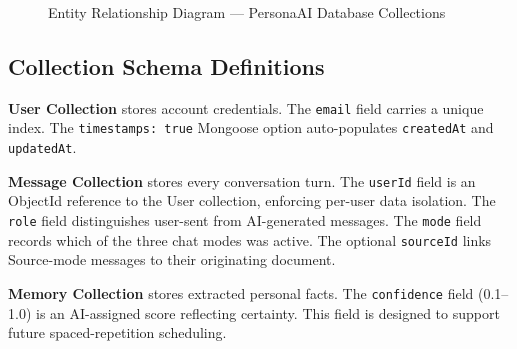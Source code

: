 \documentclass[12pt,a4paper]{report}
\begin{document}
\begin{figure}[H]
\caption{Entity Relationship Diagram — PersonaAI Database Collections}
\label{fig:erd}
\end{figure}

\subsection{Collection Schema Definitions}

\textbf{User Collection} stores account credentials. The \texttt{email} field carries a unique index. The \texttt{timestamps: true} Mongoose option auto-populates \texttt{createdAt} and \texttt{updatedAt}.

\textbf{Message Collection} stores every conversation turn. The \texttt{userId} field is an ObjectId reference to the User collection, enforcing per-user data isolation. The \texttt{role} field distinguishes user-sent from AI-generated messages. The \texttt{mode} field records which of the three chat modes was active. The optional \texttt{sourceId} links Source-mode messages to their originating document.

\textbf{Memory Collection} stores extracted personal facts. The \texttt{confidence} field (0.1–1.0) is an AI-assigned score reflecting certainty. This field is designed to support future spaced-repetition scheduling.
\end{document}
